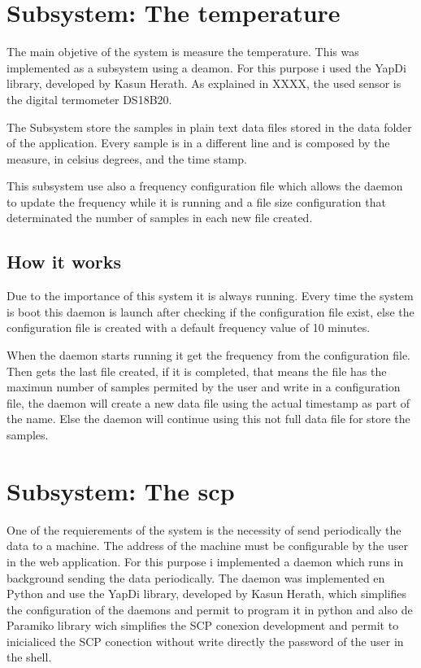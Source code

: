 	\section{Subsystem: The temperature} %
	The main objetive of the system is measure the temperature. This was implemented as a subsystem using a deamon. For this purpose i used the YapDi library, developed by Kasun Herath. As explained in XXXX, the used sensor is the digital termometer DS18B20.

	The Subsystem store the samples in plain text data files stored in the data folder of the application. Every sample is in a different line and is composed by the measure, in celsius degrees, and the time stamp.

	This subsystem use also a frequency configuration file which allows the daemon to update the frequency while it is running and a file size configuration that determinated the number of samples in each new file created.
		\subsection{How it works}
		Due to the importance of this system it is always running. Every time the system is boot this daemon is launch after checking if the configuration file exist, else the configuration file is created with a default frequency value of 10 minutes.

		When the daemon starts running it get the frequency from the configuration file. Then gets the last file created, if it is completed, that means the file has the maximun number of samples permited by the user and write in a configuration file, the daemon will create a new data file using the actual timestamp as part of the name. Else the daemon will continue using this not full data file for store the samples.
		
	\section{Subsystem: The scp} %
	One of the requierements of the system is the necessity of send periodically the data to a machine. The address of the machine must be configurable by the user in the web application. For this purpose i implemented a daemon which runs in background sending the data periodically.
	The daemon was implemented en Python and use the YapDi library, developed by Kasun Herath, which simplifies the configuration of the daemons and permit to program it in python and also de Paramiko library wich simplifies the SCP conexion development and permit to inicialiced the SCP conection without write directly the password of the user in the shell. %
